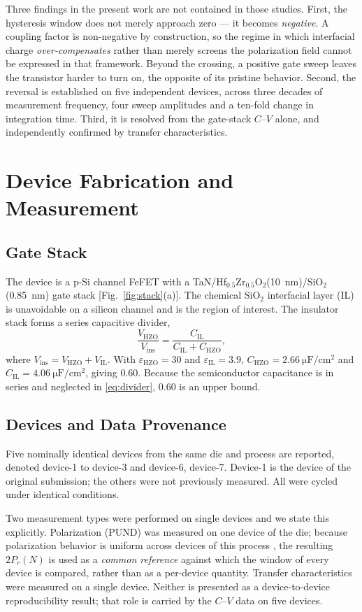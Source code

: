 \documentclass[journal]{IEEEtran}
\newcommand{\rev}[1]{#1}                    %
\newcommand{\hzo}{Hf$_{0.5}$Zr$_{0.5}$O$_2$}
\newcommand{\Prem}{P_r}
\newcommand{\Cil}{C_{\mathrm{IL}}}
\newcommand{\Cfe}{C_{\mathrm{HZO}}}
\newcommand{\uFcm}{\micro\farad\per\centi\meter\squared}
\begin{document}
\rev{Three findings in the present work are not contained in those
studies. First, the hysteresis window does not merely approach zero --- it
becomes \emph{negative}. A coupling factor is non-negative by
construction, so the regime in which interfacial charge
\emph{over-compensates} rather than merely screens the polarization
field cannot be expressed in that framework. Beyond the crossing, a
positive gate sweep leaves the transistor harder to turn on, the
opposite of its pristine behavior. Second, the reversal is established
on five independent devices, across three decades of measurement
frequency, four sweep amplitudes and a ten-fold change in integration
time. Third, it is resolved from the gate-stack $C$--$V$ alone, and
independently confirmed by transfer characteristics.}

\section{Device Fabrication and Measurement}

\subsection{Gate Stack}
The device is a p-Si channel FeFET with a
TaN/\hzo{}(\SI{10}{\nano\meter})/SiO$_2$(\SI{0.85}{\nano\meter}) gate
stack [Fig.~\ref{fig:stack}(a)]. The chemical SiO$_2$ interfacial layer
(IL) is unavoidable on a silicon channel and is the region of interest.
The insulator stack forms a series capacitive divider,
\begin{equation}
\frac{V_{\mathrm{HZO}}}{V_{\mathrm{ins}}} = \frac{\Cil}{\Cil+\Cfe},
\label{eq:divider}
\end{equation}
where $V_{\mathrm{ins}}=V_{\mathrm{HZO}}+V_{\mathrm{IL}}$. With
$\varepsilon_{\mathrm{HZO}}=30$ and $\varepsilon_{\mathrm{IL}}=3.9$,
$\Cfe=\SI{2.66}{\uFcm}$ and $\Cil=\SI{4.06}{\uFcm}$, giving 0.60.
Because the semiconductor capacitance is in series and neglected in
\eqref{eq:divider}, 0.60 is an upper bound.

\rev{\subsection{Devices and Data Provenance}
Five nominally identical devices from the same die and process are
reported, denoted device-1 to device-3 and device-6, device-7. Device-1
is the device of the original submission; the others were not previously
measured. All were cycled under identical conditions.

Two measurement types were performed on single devices and we state this
explicitly. Polarization (PUND) was measured on one device of the die;
because polarization behavior is uniform across devices of this process
\cite{ACSAMI,ACSAELM}, the resulting $2\Prem(N)$ is used as a
\emph{common reference} against which the window of every device is
compared, rather than as a per-device quantity. Transfer characteristics
were measured on a single device. Neither is presented as a
device-to-device reproducibility result; that role is carried by the
$C$--$V$ data on five devices.}
\end{document}
